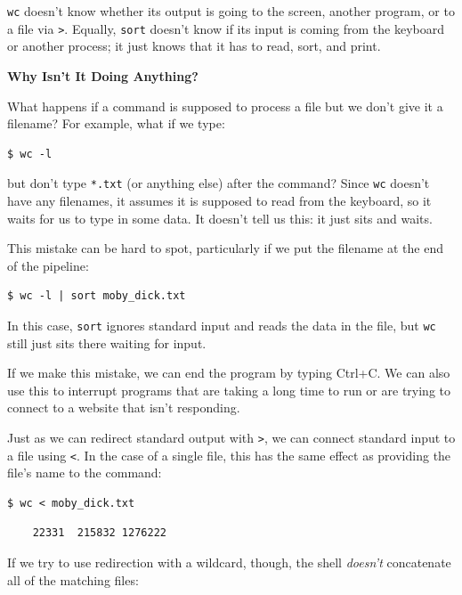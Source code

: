 \documentclass[
]{krantz}
\renewenvironment{quote}{\begin{VF}}{\end{VF}}
\begin{document}
\texttt{wc} doesn't know whether its output is going to the screen,
another program,
or to a file via \texttt{\textgreater{}}.
Equally,
\texttt{sort} doesn't know if its input is coming from the keyboard or another process;
it just knows that it has to read, sort, and print.

\begin{quote}
\textbf{Why Isn't It Doing Anything?}

What happens if a command is supposed to process a file
but we don't give it a filename?
For example, what if we type:

\begin{verbatim}
$ wc -l
\end{verbatim}

but don't type \texttt{*.txt} (or anything else) after the command?
Since \texttt{wc} doesn't have any filenames,
it assumes it is supposed to read from the keyboard,
so it waits for us to type in some data.
It doesn't tell us this:
it just sits and waits.

This mistake can be hard to spot,
particularly if we put the filename at the end of the pipeline:

\begin{verbatim}
$ wc -l | sort moby_dick.txt
\end{verbatim}

In this case,
\texttt{sort} ignores standard input and reads the data in the file,
but \texttt{wc} still just sits there waiting for input.

If we make this mistake,
we can end the program by typing Ctrl+C.
We can also use this to interrupt programs that are taking a long time to run
or are trying to connect to a website that isn't responding.
\end{quote}

Just as we can redirect standard output with \texttt{\textgreater{}},
we can connect standard input to a file using \texttt{\textless{}}.
In the case of a single file,
this has the same effect as providing the file's name to the command:

\begin{verbatim}
$ wc < moby_dick.txt
\end{verbatim}

\begin{verbatim}
    22331  215832 1276222
\end{verbatim}

If we try to use redirection with a wildcard,
though,
the shell \emph{doesn't} concatenate all of the matching files:
\end{document}

